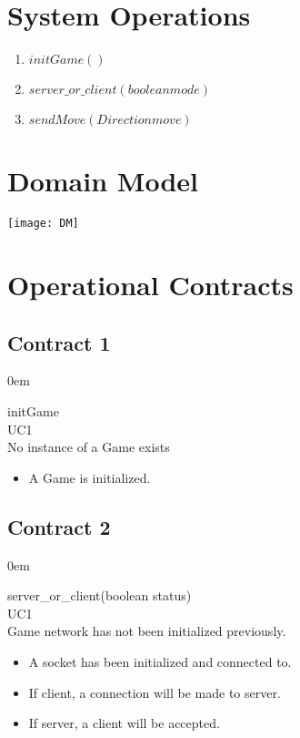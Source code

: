 \documentclass[titlepage]{article}
\begin{document}
	\section{System Operations}
	\begin{enumerate}
		\item $initGame()$
		\item $server\_or\_client(boolean mode)$
		\item $sendMove(Direction move)$
	\end{enumerate}
	
	\section{Domain Model}
		\texttt{[image: DM]}
	
	\section{Operational Contracts}
	\subsection{Contract 1}
	\itemsep0em 
	
	\textbf{} initGame\\
	\textbf{} UC1\\
	\textbf{} No instance of a Game exists\\
		\textbf{} 
				\begin{itemize} 
				\item A Game is initialized.
				\end{itemize}
		
	\subsection{Contract 2}
	\itemsep0em 
	
	\textbf{} server\_or\_client(boolean status)\\
	\textbf{} UC1\\
	\textbf{} Game network has not been initialized previously.\\
	\textbf{}
		\begin{itemize} 
			\item A socket has been initialized and connected to.
			\item If client, a connection will be made to server.
			\item If server, a client will be accepted.
		\end{itemize}
	
\end{document}
